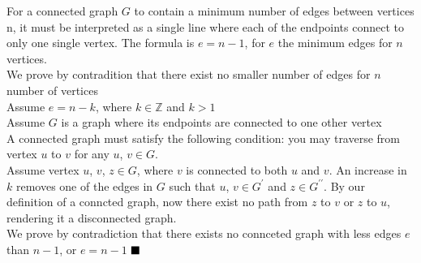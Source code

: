 \documentclass{article}
\begin{document}
\begin{enumerate}[label=\textbf{11.17}]
\begin{enumerate}
    For a connected graph $G$ to contain a minimum number of edges between vertices n, it must be interpreted as a single line where each of the endpoints connect to only one single vertex. The formula is $e = n - 1$, for $e$ the minimum edges for $n$ vertices.\\[0.25in]
    We prove by contradition that there exist no smaller number of edges for $n$ number of vertices\\[0.25in]
    Assume $e = n-k$, where $k \in \mathbb{Z}$ and $k > 1$\\
    Assume $G$ is a graph where its endpoints are connected to one other vertex\\[0.25in]
    A connected graph must satisfy the following condition: you may traverse from vertex $u$ to $v$ for any $u$, $v \in G$.\\
    Assume vertex $u$, $v$, $z \in G$, where $v$ is connected to both $u$ and $v$. An increase in $k$ removes one of the edges in $G$ such that $u$, $v \in G^\prime$ and $z \in G^{\prime\prime}$. By our definition of a conncted graph, now there exist no path from $z$ to $v$ or $z$ to $u$, rendering it a disconnected graph.\\[0.25in]
    We prove by contradiction that there exists no connceted graph with less edges $e$ than $n-1$, or $e = n-1$ $\hfill\blacksquare$
    \end{enumerate}
  \end{enumerate}
\end{document}
